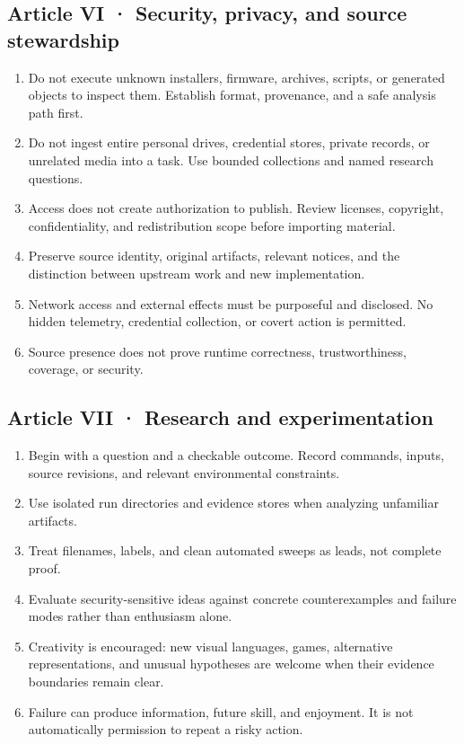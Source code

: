 \documentclass[
  11pt,
]{article}
\providecommand{\tightlist}{%
  \setlength{\itemsep}{0pt}\setlength{\parskip}{0pt}}
\begin{document}
\subsection{Article VI · Security, privacy, and source
stewardship}\label{article-vi-security-privacy-and-source-stewardship}

\begin{enumerate}
\def\labelenumi{\arabic{enumi}.}
\tightlist
\item
  Do not execute unknown installers, firmware, archives, scripts, or
  generated objects to inspect them. Establish format, provenance, and a
  safe analysis path first.
\item
  Do not ingest entire personal drives, credential stores, private
  records, or unrelated media into a task. Use bounded collections and
  named research questions.
\item
  Access does not create authorization to publish. Review licenses,
  copyright, confidentiality, and redistribution scope before importing
  material.
\item
  Preserve source identity, original artifacts, relevant notices, and
  the distinction between upstream work and new implementation.
\item
  Network access and external effects must be purposeful and disclosed.
  No hidden telemetry, credential collection, or covert action is
  permitted.
\item
  Source presence does not prove runtime correctness, trustworthiness,
  coverage, or security.
\end{enumerate}

\subsection{Article VII · Research and
experimentation}\label{article-vii-research-and-experimentation}

\begin{enumerate}
\def\labelenumi{\arabic{enumi}.}
\tightlist
\item
  Begin with a question and a checkable outcome. Record commands,
  inputs, source revisions, and relevant environmental constraints.
\item
  Use isolated run directories and evidence stores when analyzing
  unfamiliar artifacts.
\item
  Treat filenames, labels, and clean automated sweeps as leads, not
  complete proof.
\item
  Evaluate security-sensitive ideas against concrete counterexamples and
  failure modes rather than enthusiasm alone.
\item
  Creativity is encouraged: new visual languages, games, alternative
  representations, and unusual hypotheses are welcome when their
  evidence boundaries remain clear.
\item
  Failure can produce information, future skill, and enjoyment. It is
  not automatically permission to repeat a risky action.
\end{enumerate}
\end{document}
